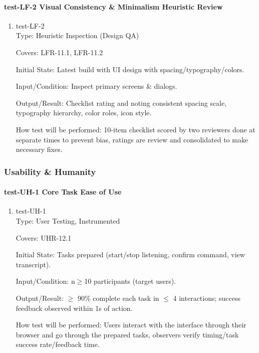 \documentclass[12pt, titlepage]{article}
\begin{document}
\paragraph{test-LF-2 Visual Consistency \& Minimalism Heuristic Review}

\begin{enumerate}
\item{test-LF-2\\}
Type: Heuristic Inspection (Design QA)

Covers: LFR-11.1, LFR-11.2

Initial State: Latest build with UI design with spacing/typography/colors.

Input/Condition: Inspect primary screens \& dialogs.

Output/Result: Checklist rating and noting consistent spacing scale, typography hierarchy, color roles, icon style.

How test will be performed: 10-item checklist scored by two reviewers done at separate times to prevent bias, ratings are review and consolidated to make necessary fixes.
\end{enumerate}

\subsubsection{Usability \& Humanity}

\paragraph{test-UH-1 Core Task Ease of Use}

\begin{enumerate}
\item{test-UH-1\\}
Type: User Testing, Instrumented

Covers: UHR-12.1

Initial State: Tasks prepared (start/stop listening, confirm command, view transcript).

Input/Condition: n$\geq$10 participants (target users).

Output/Result: $\geq$ 90\% complete each task in $\leq$ 4 interactions; success feedback observed within 1s of action.

How test will be performed: Users interact with the interface through their browser and go through the prepared tasks, observers verify timing/task success rate/feedback time.
\end{enumerate}
\end{document}
